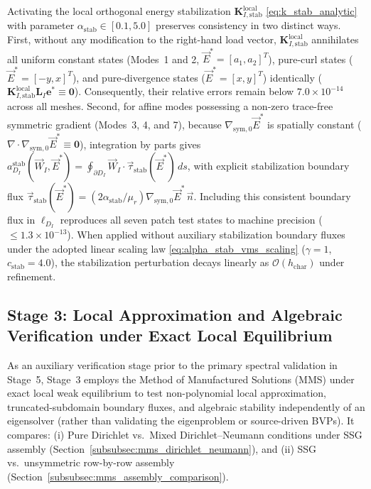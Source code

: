 \documentclass[VANCOUVER]{USG}
\begin{document}
\begin{remark}
\label{rem:patch_test_stab}
    Activating the local orthogonal energy stabilization $\mathbf{K}_{I,\mathrm{stab}}^{\mathrm{local}}$ \eqref{eq:k_stab_analytic} with parameter $\alpha_{\mathrm{stab}} \in [0.1, 5.0]$ preserves consistency in two distinct ways. First, without any modification to the right-hand load vector, $\mathbf{K}_{I, \mathrm{stab}}^{\mathrm{local}}$ annihilates all uniform constant states (Modes~1 and 2, $\vec{E}^* = [a_1, a_2]^T$), pure-curl states ($\vec{E}^* = [-y, x]^T$), and pure-divergence states ($\vec{E}^* = [x, y]^T$) identically ($\mathbf{K}_{I, \mathrm{stab}}^{\mathrm{local}} \mathbf{L}_I \mathbf{e}^* \equiv \mathbf{0}$). Consequently, their relative errors remain below $7.0 \times 10^{-14}$ across all meshes. Second, for affine modes possessing a non-zero trace-free symmetric gradient (Modes~3, 4, and 7), because $\nabla_{\mathrm{sym},0}\vec{E}^*$ is spatially constant ($\nabla \cdot \nabla_{\mathrm{sym},0}\vec{E}^* \equiv \mathbf{0}$), integration by parts gives $a_{D_I}^{\mathrm{stab}}(\vec{W}_I, \vec{E}^*) = \oint_{\partial D_I} \vec{W}_I \cdot \vec{\tau}_{\mathrm{stab}}(\vec{E}^*) \, ds$, with explicit stabilization boundary flux $\vec{\tau}_{\mathrm{stab}}(\vec{E}^*) = (2\alpha_{\mathrm{stab}}/\mu_r)\nabla_{\mathrm{sym},0}\vec{E}^*\,\vec{n}$. Including this consistent boundary flux in $\ell_{D_I}$ reproduces all seven patch test states to machine precision ($\le 1.3 \times 10^{-13}$). When applied without auxiliary stabilization boundary fluxes under the adopted linear scaling law \eqref{eq:alpha_stab_vms_scaling} ($\gamma = 1$, $c_{\mathrm{stab}} = 4.0$), the stabilization perturbation decays linearly as $\mathcal{O}(h_{\mathrm{char}})$ under refinement.
\end{remark}

\subsection{Stage 3: Local Approximation and Algebraic Verification under Exact Local Equilibrium}
\label{subsec:stage3_mms}

As an auxiliary verification stage prior to the primary spectral validation in Stage~5, Stage~3 employs the Method of Manufactured Solutions (MMS) under exact local weak equilibrium to test non-polynomial local approximation, truncated-subdomain boundary fluxes, and algebraic stability independently of an eigensolver (rather than validating the eigenproblem or source-driven BVPs). It compares: (i) Pure Dirichlet vs.\ Mixed Dirichlet--Neumann conditions under SSG assembly (Section~\ref{subsubsec:mms_dirichlet_neumann}), and (ii) SSG vs.\ unsymmetric row-by-row assembly (Section~\ref{subsubsec:mms_assembly_comparison}).
\end{document}
